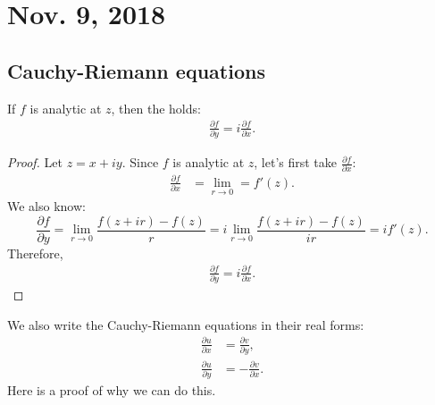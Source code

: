 \section{Nov. 9, 2018}
\subsection{Cauchy-Riemann equations}

\begin{theorem}
    If $f$ is analytic at $z$, then the  holds:
    \begin{align*}
        \frac{\partial f}{\partial y} = i \frac{\partial f}{\partial x}.
    \end{align*}
\end{theorem}

\begin{proof}
    Let $z = x + iy$.
    Since $f$ is analytic at $z$, let's first take $\frac{\partial f}{\partial x}$:
    \begin{align*}
        \frac{\partial f}{\partial x} &= \lim_{r \to 0} = f'(z).
    \end{align*}
    We also know:
    \[ \frac{\partial f}{\partial y} = \lim_{r \to 0} \frac{f(z+ir) - f(z)}{r} = i \lim_{r \to 0} \frac{f(z+ir) - f(z)}{ir} = if'(z). \]
    Therefore,
    \begin{align*}
        \frac{\partial f}{\partial y} = i \frac{\partial f}{\partial x}.
    \end{align*}
        
\end{proof}
\noindent
We also write the Cauchy-Riemann equations in their real forms:
\begin{align*}
    \frac{\partial u}{\partial x} &= \frac{\partial v}{\partial y}, \\
    \frac{\partial u}{\partial y} &= -\frac{\partial v}{\partial x}.
\end{align*}
Here is a proof of why we can do this.

